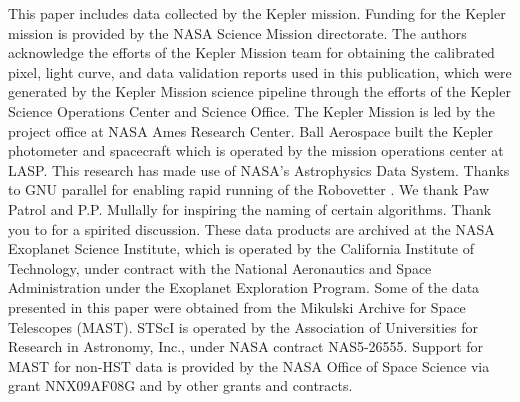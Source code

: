 \documentclass[apj,twocolappendix,numberedappendix]{emulateapj}
\renewcommand{\_}{\discretionary{\underscore}{}{\underscore}}  %
\begin{document}













\acknowledgments
This paper includes data collected by the Kepler mission. Funding for the Kepler mission is provided by the NASA Science Mission directorate. The authors acknowledge the efforts of the Kepler Mission team for obtaining the calibrated pixel, light curve, and data validation reports used in this publication, which were generated by the Kepler Mission science pipeline through the efforts of the Kepler Science Operations Center and Science Office. The Kepler Mission is led by the project office at NASA Ames Research Center. Ball Aerospace built the Kepler photometer and spacecraft which is operated by the mission operations center at LASP.  This research has made use of NASA's Astrophysics Data System.  Thanks to GNU parallel for enabling rapid running of the Robovetter \citep{Tange2011a}. We thank Paw Patrol and P.P. Mullally for inspiring the naming of certain algorithms. Thank you to \citet{Turbo-King2017} for a spirited discussion. These data products are archived at the NASA Exoplanet Science Institute, which is operated by the California Institute of Technology, under contract with the National Aeronautics and Space Administration under the Exoplanet Exploration Program. Some of the data presented in this paper were obtained from the Mikulski Archive for Space Telescopes (MAST). STScI is operated by the Association of Universities for Research in Astronomy, Inc., under NASA contract NAS5-26555. Support for MAST for non-HST data is provided by the NASA Office of Space Science via grant NNX09AF08G and by other grants and contracts.



%



\clearpage
\appendix






\clearpage
\tableofcontents
\end{document}
